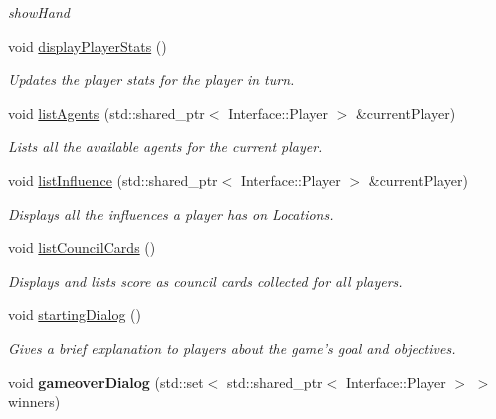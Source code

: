 \begin{DoxyCompactItemize}
\begin{DoxyCompactList}\small\item\em show\-Hand \end{DoxyCompactList}\item 
void \hyperlink{class_game_window_a1dabab97e9c9c2b012d44d0572fb566a}{display\-Player\-Stats} ()
\begin{DoxyCompactList}\small\item\em Updates the player stats for the player in turn. \end{DoxyCompactList}\item 
void \hyperlink{class_game_window_a6ebae40624b598fe99b59a15e8ab56a7}{list\-Agents} (std\-::shared\-\_\-ptr$<$ Interface\-::\-Player $>$ \&current\-Player)
\begin{DoxyCompactList}\small\item\em Lists all the available agents for the current player. \end{DoxyCompactList}\item 
void \hyperlink{class_game_window_a2a65088ddcbd4a3a2871c15cf4df816b}{list\-Influence} (std\-::shared\-\_\-ptr$<$ Interface\-::\-Player $>$ \&current\-Player)
\begin{DoxyCompactList}\small\item\em Displays all the influences a player has on Locations. \end{DoxyCompactList}\item 
\hypertarget{class_game_window_a16fcc70acdc4b5efc393d33fdae6605d}{void \hyperlink{class_game_window_a16fcc70acdc4b5efc393d33fdae6605d}{list\-Council\-Cards} ()}\label{class_game_window_a16fcc70acdc4b5efc393d33fdae6605d}

\begin{DoxyCompactList}\small\item\em Displays and lists score as council cards collected for all players. \end{DoxyCompactList}\item 
\hypertarget{class_game_window_aa07c43fde986d572a348c974fc801965}{void \hyperlink{class_game_window_aa07c43fde986d572a348c974fc801965}{starting\-Dialog} ()}\label{class_game_window_aa07c43fde986d572a348c974fc801965}

\begin{DoxyCompactList}\small\item\em Gives a brief explanation to players about the game's goal and objectives. \end{DoxyCompactList}\item 
\hypertarget{class_game_window_a2986eb3364881078424ca5f353faeca9}{void {\bfseries gameover\-Dialog} (std\-::set$<$ std\-::shared\-\_\-ptr$<$ Interface\-::\-Player $>$ $>$ winners)}\label{class_game_window_a2986eb3364881078424ca5f353faeca9}

\end{DoxyCompactItemize}



